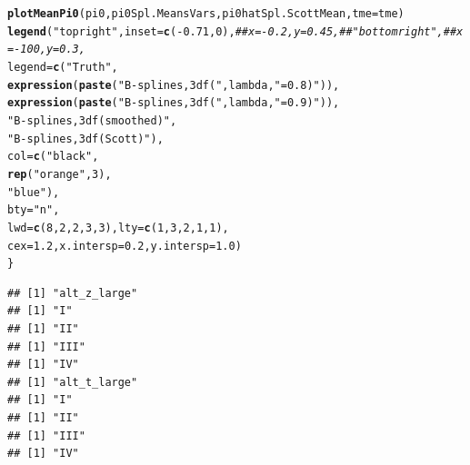 \documentclass{article}\usepackage[]{graphicx}\usepackage[]{color}
\makeatletter
\newcommand{\hlnum}[1]{\textcolor[rgb]{0.686,0.059,0.569}{#1}}%
\newcommand{\hlstr}[1]{\textcolor[rgb]{0.192,0.494,0.8}{#1}}%
\newcommand{\hlcom}[1]{\textcolor[rgb]{0.678,0.584,0.686}{\textit{#1}}}%
\newcommand{\hlopt}[1]{\textcolor[rgb]{0,0,0}{#1}}%
\newcommand{\hlstd}[1]{\textcolor[rgb]{0.345,0.345,0.345}{#1}}%
\newcommand{\hlkwc}[1]{\textcolor[rgb]{0.333,0.667,0.333}{#1}}%
\newcommand{\hlkwd}[1]{\textcolor[rgb]{0.737,0.353,0.396}{\textbf{#1}}}%
\newenvironment{kframe}{%
 \def\at@end@of@kframe{}%
 \ifinner\ifhmode%
  \def\at@end@of@kframe{\end{minipage}}%
  \begin{minipage}{\columnwidth}%
 \fi\fi%
 \def\FrameCommand##1{\hskip\@totalleftmargin \hskip-\fboxsep
 \colorbox{shadecolor}{##1}\hskip-\fboxsep
     \hskip-\linewidth \hskip-\@totalleftmargin \hskip\columnwidth}%
 \MakeFramed {\advance\hsize-\width
   \@totalleftmargin\z@ \linewidth\hsize
   \@setminipage}}%
 {\par\unskip\endMakeFramed%
 \at@end@of@kframe}
\newenvironment{knitrout}{}{} %
\makeatother
\begin{document}
\begin{knitrout}
\begin{kframe}
\begin{alltt}
  \hlkwd{plotMeanPi0}\hlstd{(pi0, pi0Spl.MeansVars, pi0hatSpl.ScottMean,} \hlkwc{tme}\hlstd{=tme)}
  \hlkwd{legend}\hlstd{(}\hlstr{"topright"}\hlstd{,} \hlkwc{inset}\hlstd{=}\hlkwd{c}\hlstd{(}\hlopt{-}\hlnum{0.71}\hlstd{,}\hlnum{0}\hlstd{),}\hlcom{##x=-0.2, y=0.45,##"bottomright", ##x=-100, y=0.3, }
         \hlkwc{legend}\hlstd{=}\hlkwd{c}\hlstd{(}\hlstr{"Truth"}\hlstd{,}
                  \hlkwd{expression}\hlstd{(}\hlkwd{paste}\hlstd{(}\hlstr{"B-splines, 3 df ("}\hlstd{, lambda,} \hlstr{"=0.8)"}\hlstd{)),}
                  \hlkwd{expression}\hlstd{(}\hlkwd{paste}\hlstd{(}\hlstr{"B-splines, 3 df ("}\hlstd{, lambda,} \hlstr{"=0.9)"}\hlstd{)),}
                  \hlstr{"B-splines, 3 df (smoothed)"}\hlstd{,}
                  \hlstr{"B-splines, 3 df (Scott)"}\hlstd{),}
         \hlkwc{col}\hlstd{=}\hlkwd{c}\hlstd{(}\hlstr{"black"}\hlstd{,}
               \hlkwd{rep}\hlstd{(}\hlstr{"orange"}\hlstd{,}\hlnum{3}\hlstd{),}
               \hlstr{"blue"}\hlstd{),}
         \hlkwc{bty}\hlstd{=}\hlstr{"n"}\hlstd{,}
         \hlkwc{lwd}\hlstd{=}\hlkwd{c}\hlstd{(}\hlnum{8}\hlstd{,}\hlnum{2}\hlstd{,}\hlnum{2}\hlstd{,}\hlnum{3}\hlstd{,}\hlnum{3}\hlstd{),} \hlkwc{lty}\hlstd{=}\hlkwd{c}\hlstd{(}\hlnum{1}\hlstd{,}\hlnum{3}\hlstd{,}\hlnum{2}\hlstd{,}\hlnum{1}\hlstd{,}\hlnum{1}\hlstd{),}
         \hlkwc{cex}\hlstd{=}\hlnum{1.2}\hlstd{,} \hlkwc{x.intersp}\hlstd{=}\hlnum{0.2}\hlstd{,} \hlkwc{y.intersp}\hlstd{=}\hlnum{1.0}\hlstd{)}
\hlstd{\}}
\end{alltt}
\begin{verbatim}
## [1] "alt_z_large"
## [1] "I"
## [1] "II"
## [1] "III"
## [1] "IV"
## [1] "alt_t_large"
## [1] "I"
## [1] "II"
## [1] "III"
## [1] "IV"
\end{verbatim}
\end{kframe}


\end{knitrout}
\end{document}
